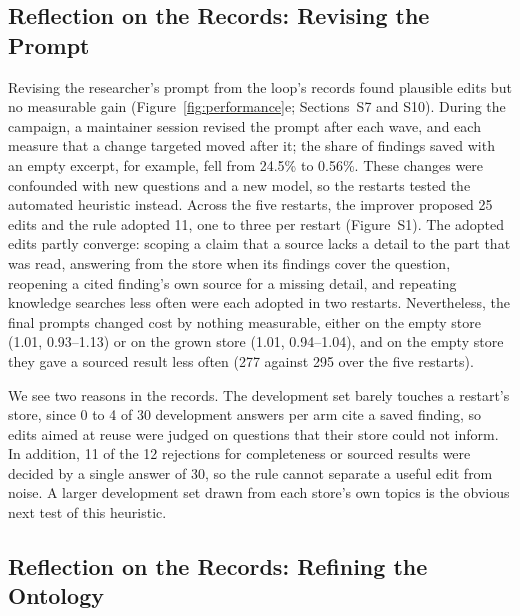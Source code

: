 \documentclass[journal=mamobx,manuscript=article]{achemso}
\begin{document}
\subsection{Reflection on the Records: Revising the Prompt}
\label{sec:improve-results}

Revising the researcher's prompt from the loop's records found plausible edits but no measurable gain (Figure~\ref{fig:performance}e; Sections~S7 and S10).
During the campaign, a maintainer session revised the prompt after each wave, and each measure that a change targeted moved after it; the share of findings saved with an empty excerpt, for example, fell from 24.5\% to 0.56\%.
These changes were confounded with new questions and a new model, so the restarts tested the automated heuristic instead.
Across the five restarts, the improver proposed 25 edits and the rule adopted 11, one to three per restart (Figure~S1).
The adopted edits partly converge: scoping a claim that a source lacks a detail to the part that was read, answering from the store when its findings cover the question, reopening a cited finding's own source for a missing detail, and repeating knowledge searches less often were each adopted in two restarts.
Nevertheless, the final prompts changed cost by nothing measurable, either on the empty store (1.01, 0.93--1.13) or on the grown store (1.01, 0.94--1.04), and on the empty store they gave a sourced result less often (277 against 295 over the five restarts).

We see two reasons in the records.
The development set barely touches a restart's store, since 0 to 4 of 30 development answers per arm cite a saved finding, so edits aimed at reuse were judged on questions that their store could not inform.
In addition, 11 of the 12 rejections for completeness or sourced results were decided by a single answer of 30, so the rule cannot separate a useful edit from noise.
A larger development set drawn from each store's own topics is the obvious next test of this heuristic.

\subsection{Reflection on the Records: Refining the Ontology}
\label{sec:ontology}
\end{document}
